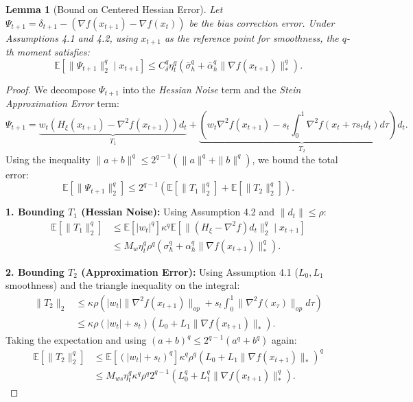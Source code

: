 \documentclass{article}
\theoremstyle{plain}
\newtheorem{lemma}[theorem]{Lemma}
\theoremstyle{definition}
\theoremstyle{remark}
\begin{document}
\begin{lemma}[Bound on Centered Hessian Error]
\label{lemma:hessian_constants}
Let $\Psi_{t+1} = \delta_{t+1} - (\nabla f(x_{t+1}) - \nabla f(x_t))$ be the bias correction error. Under Assumptions 4.1 and 4.2, using $x_{t+1}$ as the reference point for smoothness, the $q$-th moment satisfies:
\begin{equation}
    \mathbb{E}[\|\Psi_{t+1}\|_2^q \mid x_{t+1}] \le C_\delta^q \eta_t^q \left( \bar{\sigma}^q_h + \bar{\alpha}^q_h \|\nabla f(x_{t+1})\|_*^q \right).
\end{equation}
\end{lemma}

\begin{proof}
We decompose $\Psi_{t+1}$ into the \textit{Hessian Noise} term and the \textit{Stein Approximation Error} term:
$$ \Psi_{t+1} = \underbrace{w_t (H_\xi(x_{t+1}) - \nabla^2 f(x_{t+1})) d_t}_{T_1} + \underbrace{\left( w_t \nabla^2 f(x_{t+1}) - s_t \int_0^1 \nabla^2 f(x_t + \tau s_t d_t) d\tau \right) d_t}_{T_2}. $$
Using the inequality $\|a+b\|^q \le 2^{q-1}(\|a\|^q + \|b\|^q)$, we bound the total error:
$$ \mathbb{E}[\|\Psi_{t+1}\|_2^q] \le 2^{q-1} \left( \mathbb{E}[\|T_1\|_2^q] + \mathbb{E}[\|T_2\|_2^q] \right). $$

\textbf{1. Bounding $T_1$ (Hessian Noise):}
Using Assumption 4.2 and $\|d_t\| \le \rho$:
\begin{align*}
    \mathbb{E}[\|T_1\|_2^q] &\le \mathbb{E}[|w_t|^q] \kappa^q \mathbb{E}[\|(H_\xi - \nabla^2 f)d_t\|_2^q \mid x_{t+1}] \\
    &\le M_w \eta_t^q \rho^q \left( \sigma_h^q + \alpha_h^q \|\nabla f(x_{t+1})\|_*^q \right).
\end{align*}

\textbf{2. Bounding $T_2$ (Approximation Error):}
Using Assumption 4.1 ($L_0, L_1$ smoothness) and the triangle inequality on the integral:
\begin{align*}
    \|T_2\|_2 &\le \kappa \rho \left( |w_t| \|\nabla^2 f(x_{t+1})\|_{op} + s_t \int_0^1 \|\nabla^2 f(x_\tau)\|_{op} d\tau \right) \\
    &\le \kappa \rho (|w_t| + s_t) \left( L_0 + L_1 \|\nabla f(x_{t+1})\|_* \right).
\end{align*}
Taking the expectation and using $(a+b)^q \le 2^{q-1}(a^q+b^q)$ again:
\begin{align*}
    \mathbb{E}[\|T_2\|_2^q] &\le \mathbb{E}[(|w_t|+s_t)^q] \kappa^q \rho^q \left( L_0 + L_1 \|\nabla f(x_{t+1})\|_* \right)^q \\
    &\le M_{ws} \eta_t^q \kappa^q \rho^q 2^{q-1} \left( L_0^q + L_1^q \|\nabla f(x_{t+1})\|_*^q \right).
\end{align*}


\end{proof}
\end{document}
